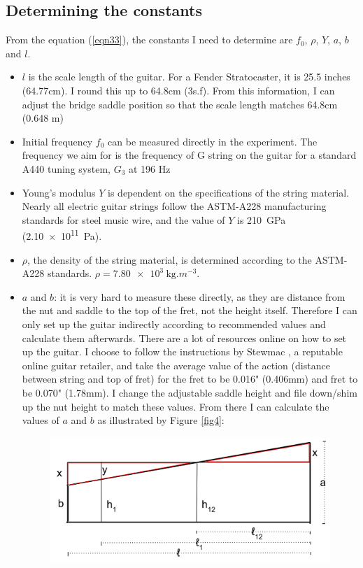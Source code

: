 \documentclass[11pt]{article}
\begin{document}
\begin{flushleft}
        \subsection{Determining the constants}
            From the equation (\ref{eqn33}), the constants I need to determine are $f_0$, $\rho$, $Y$, $a$, $b$ and $l$. 
            \begin{itemize}
                \item $l$ is the scale length of the guitar. For a Fender Stratocaster, it is 25.5 inches (64.77cm). \cite{scale} I round this up to 64.8cm (3s.f). From this information, I can adjust the bridge saddle position so that the scale length matches 64.8cm (0.648 m)
                \item Initial frequency $f_0$ can be measured directly in the experiment. The frequency we aim for is the frequency of G string on the guitar for a standard A440 tuning system, $G_3$ at 196 Hz \cite{freq_chart}
                \item Young's modulus $Y$ is dependent on the specifications of the string material. Nearly all electric guitar strings follow the ASTM-A228 manufacturing standards for steel music wire, and the value of $Y$ is \SI{210}{\giga\pascal} (\SI{2.10e11}{\pascal}). \cite{astm} 
                \item $\rho$, the density of the string material, is determined according to the ASTM-A228 standards. $\rho = \SI{7.80e3}{\kg.m^{-3}}$. \cite{astm}
                \item $a$ and $b$: it is very hard to measure these directly, as they are distance from the nut and saddle to the top of the fret, not the height itself. Therefore I can only set up the guitar indirectly according to recommended values and calculate them afterwards. There are a lot of resources online on how to set up the guitar. I choose to follow the instructions by Stewmac \cite{stewmac}, a reputable online guitar retailer, and take the average value of the action (distance between string and top of fret) for the  fret to be 0.016" (0.406mm) and  fret to be 0.070" (1.78mm). I change the adjustable saddle height and file down/shim up the nut height to match these values. From there I can calculate the values of $a$ and $b$ as illustrated by Figure \ref{fig4}: \par
                \begin{figure}[ht]
                    \includegraphics[width = \textwidth]{fig4.png}

\end{figure}
\end{itemize}
\end{flushleft}
\end{document}
